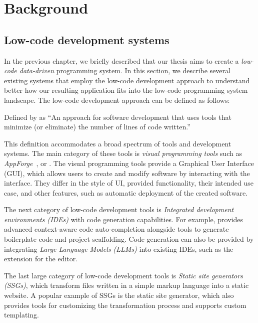 \chapter{Background}
\label{chap:background}
\section{Low-code development systems}
\label{sec:low-code}

In the previous chapter, we briefly described that our thesis aims to create a \emph{low-code data-driven} programming system.
In this section, we describe several existing systems that employ the low-code development approach to understand better how our resulting application fits into the low-code programming system landscape.
The low-code development approach can be defined as follows:
\begin{defn}
	Defined by \citet{Pinho_Aguiar_Amaral_2023} as ``An approach for software development that uses tools that minimize (or eliminate) the number of lines of code written.''
\end{defn}
This definition accommodates a broad spectrum of tools and development systems.
The main category of these tools is \emph{visual programming tools} such as \emph{AppForge}~\cite{Yang_Gupta_Botev_Churchill_Levchenko_Shanmugasundaram_2008}, \citet{darklang} or \citet{mendix}.
The visual programming tools provide a Graphical User Interface (GUI), which allows users to create and modify software by interacting with the interface.
They differ in the style of UI, provided functionality, their intended use case, and other features, such as automatic deployment of the created software.

The next category of low-code development tools is \emph{Integrated development environments (IDEs)} with code generation capabilities.
For example, \citet{Rider} provides advanced context-aware code auto-completion alongside tools to generate boilerplate code and project scaffolding.
Code generation can also be provided by integrating \emph{Large Language Models (LLMs)} into existing IDEs, such as the~\citet{copilot} extension for the \citet{vscode} editor.

The last large category of low-code development tools is \emph{Static site generators (SSGs)}, which transform files written in a simple markup language into a static website.
A popular example of SSGs is the \citet{hugo} static site generator, which also provides tools for customizing the transformation process and supports custom templating.

